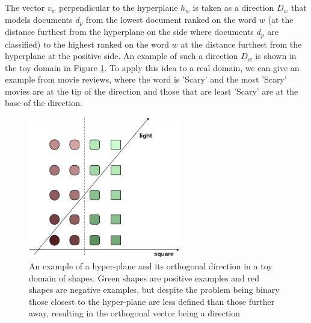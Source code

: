 The vector $v_w$ perpendicular to the hyperplane $h_w $ is taken as a direction $D_w $ that models documents $d_p$ from the lowest document ranked on the word $w $ (at the distance furthest from the hyperplane on the side where documents $d_p $ are classified) to the highest ranked on the word $w$ at the distance furthest from the hyperplane at the positive side. An example of such a direction $D_w$ is shown in the toy domain in Figure \ref{ch3:ToyHyperPlane}. To  apply this idea to a real domain, we can give an example from movie reviews, where the word is 'Scary' and the most 'Scary' movies are at the tip of the direction and those that are least 'Scary' are at the base of the direction.  %


\begin{figure}[t]
	\includegraphics[width=250px]{images/ToyHyperplane.png}
	\centering
	\caption{An example of a hyper-plane and its orthogonal direction in a toy domain of shapes. Green shapes are positive examples and red shapes are negative examples, but despite the problem being binary those closest to the hyper-plane are less defined than those further away, resulting in the orthogonal vector being a direction}\label{ch3:ToyHyperPlane}
\end{figure}




